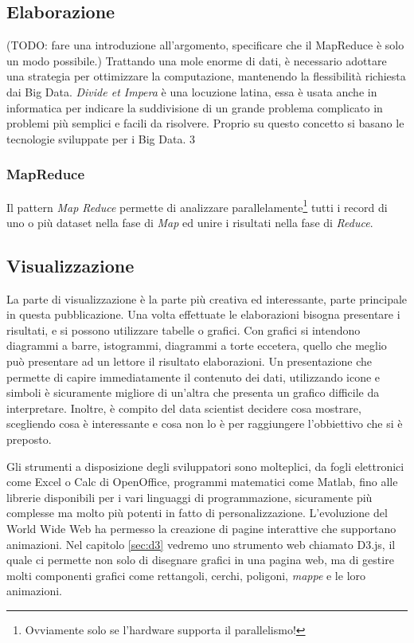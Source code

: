 \subsection{Elaborazione}\label{sec:elaborazione}
(TODO: fare una introduzione all'argomento, specificare che il MapReduce è solo un modo possibile.)
Trattando una mole enorme di dati, è necessario adottare una strategia per ottimizzare la computazione, mantenendo la flessibilità richiesta dai Big Data. \emph{Divide et Impera} è una locuzione latina, essa è usata anche in informatica per indicare la suddivisione di un grande problema complicato in problemi più semplici e facili da risolvere. Proprio su questo concetto si basano le tecnologie sviluppate per i Big Data. 3

\subsubsection{MapReduce}\label{sec:mapreduce}
Il pattern \emph{Map Reduce} permette di analizzare parallelamente\footnote{Ovviamente solo se l'hardware supporta il parallelismo!} tutti i record di uno o più dataset nella fase di \emph{Map} ed unire i risultati nella fase di \emph{Reduce}.



\subsection{Visualizzazione}\label{sec:visualizzazione}
La parte di visualizzazione è la parte più creativa ed interessante, parte principale in questa pubblicazione. Una volta effettuate le elaborazioni bisogna presentare i risultati, e si possono utilizzare tabelle o grafici. Con grafici si intendono diagrammi a barre, istogrammi, diagrammi a torte eccetera, quello che meglio può presentare ad un lettore il risultato elaborazioni. Un presentazione che permette di capire immediatamente il contenuto dei dati, utilizzando icone e simboli è sicuramente migliore di un'altra che presenta un grafico difficile da interpretare. Inoltre, è compito del data scientist decidere cosa mostrare, scegliendo cosa è interessante e cosa non lo è per raggiungere l'obbiettivo che si è preposto.

Gli strumenti a disposizione degli sviluppatori sono molteplici, da fogli elettronici come Excel o Calc di OpenOffice, programmi matematici come Matlab, fino alle librerie disponibili per i vari linguaggi di programmazione, sicuramente più complesse ma molto più potenti in fatto di personalizzazione. L'evoluzione del World Wide Web ha permesso la creazione di pagine interattive che supportano animazioni. Nel capitolo \ref{sec:d3} vedremo uno strumento web chiamato D3.js, il quale ci permette non solo di disegnare grafici in una pagina web, ma di gestire molti componenti grafici come rettangoli, cerchi, poligoni, \emph{mappe} e le loro animazioni.






